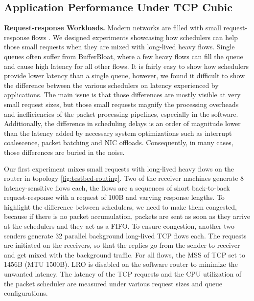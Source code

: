 

\subsection{Application Performance Under TCP Cubic}
\label{sec:scrr-eval-latency}
\label{sec:scrr-eval-streaming}
%

\textbf{Request-response Workloads.} 
Modern networks are filled with small request-response flows
\cite{wild,social,homa}. We designed experiments showcasing how
schedulers can help those small requests when they are mixed with
long-lived heavy flows. Single queues often suffer from BufferBloat,
where a few heavy flows can fill the queue and cause high latency for
all other flows. It is fairly easy to show how schedulers provide
lower latency than a single queue, however, we found it difficult to
show the difference between the various schedulers on latency
experienced by applications. The main issue is that those differences
are mostly visible at very small request sizes, but those small
requests magnify the processing overheads and inefficiencies of the
packet processing pipelines, especially in the software. Additionally,
the difference in scheduling delays is an order of magnitude lower
than the latency added by necessary system optimizations such as
interrupt coalescence, packet batching and NIC offloads. Consequently,
in many cases, those differences are buried in the noise.

Our first experiment mixes small requests with long-lived heavy flows
on the router in topology \ref{fig:testbed-routing}.  Two of the
receiver machines generate 8 latency-sensitive flows each, the flows
are a sequences of short back-to-back request-response with a request
of 100B and varying response lengths. To highlight the difference
between schedulers, we need to make them congested, because if there
is no packet accumulation, packets are sent as soon as they arrive at
the schedulers and they act as a FIFO. To ensure congestion, another
two senders generate 32 parallel background long-lived TCP flows
each. The requests are initiated on the receivers, so that the replies
go from the sender to receiver and get mixed with the background
traffic. For all flows, the MSS of TCP set to 1456B (MTU 1500B). LRO
is disabled on the software router to minimize the unwanted
latency. The latency of the TCP requests and the CPU utilization of
the packet scheduler are measured under various request sizes and
queue configurations.

